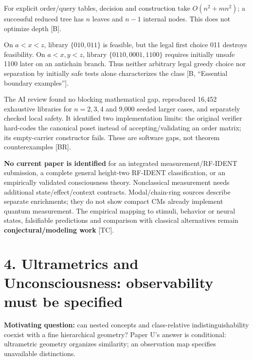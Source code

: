 \documentclass[10pt,letterpaper]{article}
\begin{document}
For explicit order/query tables, decision and construction take \(O(n^2+mn^2)\); a successful reduced tree has \(n\) leaves and \(n-1\) internal nodes. This does not optimize depth [B].\par

On \(a<x<z\), library \(\{010,011\}\) is feasible, but the legal first choice 011 destroys feasibility. On \(a<x,y<z\), library \(\{0110,0001,1100\}\) requires initially unsafe 1100 later on an antichain branch. Thus neither arbitrary legal greedy choice nor separation by initially safe tests alone characterizes the class [B, ``Essential boundary examples''].\par

The AI review found no blocking mathematical gap, reproduced 16,452 exhaustive libraries for \(n=2,3,4\) and 9,000 seeded larger cases, and separately checked local safety. It identified two implementation limits: the original verifier hard-codes the canonical poset instead of accepting/validating an order matrix; its empty-carrier constructor fails. These are software gaps, not theorem counterexamples [BR].\par

\textbf{No current paper is identified} for an integrated measurement/RF-IDENT submission, a complete general height-two RF-IDENT classification, or an empirically validated consciousness theory. Nonclassical measurement needs additional state/effect/context contracts. Modal/chain-ring sources describe separate enrichments; they do not show compact CMs already implement quantum measurement. The empirical mapping to stimuli, behavior or neural states, falsifiable predictions and comparison with classical alternatives remain \textbf{conjectural/modeling work} [TC].\par

\section*{4. Ultrametrics and Unconsciousness: observability must be specified}

\textbf{Motivating question:} can nested concepts and class-relative indistinguishability coexist with a fine hierarchical geometry? Paper U's answer is conditional: ultrametric geometry organizes similarity; an observation map specifies unavailable distinctions.\par
\end{document}
